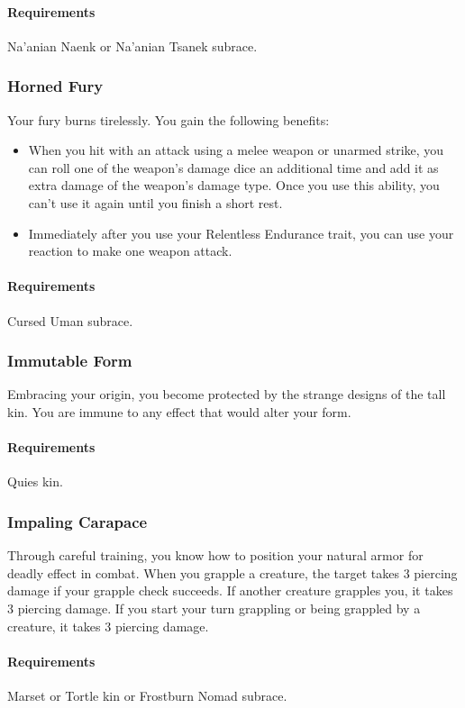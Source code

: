     \paragraph{Requirements} Na'anian Naenk or Na'anian Tsanek subrace.
\subsubsection{Horned Fury} \label{feat::hornedfury}
    Your fury burns tirelessly.
    You gain the following benefits:
    \begin{itemize}
        \item When you hit with an attack using a melee weapon or unarmed strike, you can roll one of the weapon's damage dice an additional time and add it as extra damage of the weapon's damage type.
        Once you use this ability, you can't use it again until you finish a short rest.
        \item Immediately after you use your Relentless Endurance trait, you can use your reaction to make one weapon attack.
    \end{itemize}
    \paragraph{Requirements} Cursed Uman subrace.
\subsubsection{Immutable Form} \label{feat::immutableform}
    Embracing your origin, you become protected by the strange designs of the tall kin.
    You are immune to any effect that would alter your form.
    \paragraph{Requirements} Quies kin.
\subsubsection{Impaling Carapace} \label{feat::impalingcarapace}
    Through careful training, you know how to position your natural armor for deadly effect in combat.
    When you grapple a creature, the target takes 3 piercing damage if your grapple check succeeds.
    If another creature grapples you, it takes 3 piercing damage.
    If you start your turn grappling or being grappled by a creature, it takes 3 piercing damage.
    \paragraph{Requirements} Marset or Tortle kin or Frostburn Nomad subrace.

